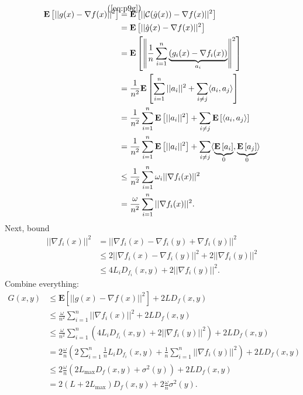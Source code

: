 \documentclass[12pt]{article}
\newcommand{\defeq}[2]{\stackrel{\mathclap{\normalfont\mbox{#1}}}{#2}}
\begin{document}
\begin{equation*}
    \begin{split}
        \mathbf{E}\left[ ||g(x) - \nabla f(x)||^2 \right] &\defeq{(\ref{eq:p9g})}{=} \mathbf{E}\left[ ||\mathcal{C}(\hat{g}(x)) - \nabla f(x)||^2 \right] \\
                &= \mathbf{E}\left[ ||\hat{g}(x) - \nabla f(x)||^2 \right] \\
                &= \mathbf{E}\left[ \left\| \frac{1}{n} \sum_{i=1}^n \underbrace{(g_i(x) - \nabla f_i(x))}_{a_i}\right\|^2\right] \\
                &= \frac{1}{n^2} \mathbf{E}\left[\sum_{i=1}^n ||a_i||^2 + \sum_{i\neq j}\langle a_i, a_j \rangle \right] \\
                &= \frac{1}{n^2} \sum_{i=1}^n \mathbf{E}\left[||a_i||^2\right] + \sum_{i\neq j} \mathbf{E}\left[\langle a_i, a_j \rangle \right] \\
                &= \frac{1}{n^2} \sum_{i=1}^n \mathbf{E}\left[||a_i||^2\right] + \sum_{i\neq j} \langle \underbrace{\mathbf{E}\left[a_i\right]}_{0}, \underbrace{\mathbf{E}\left[a_j\right]}_{0} \rangle \\
                &\leq \frac{1}{n^2} \sum_{i=1}^n \omega_i || \nabla f_i (x)||^2 \\
                &= \frac{\omega}{n^2} \sum_{i=1}^n || \nabla f_i (x)||^2.
    \end{split}
\end{equation*}
Next, bound
\begin{equation*}
    \begin{split}
        || \nabla f_i(x)||^2 &= || \nabla f_i(x) - \nabla f_i(y) + \nabla f_i(y)||^2 \\
                            &\leq 2|| \nabla f_i(x) - \nabla f_i(y)||^2 + 2 || \nabla f_i(y)||^2 \\
                            &\leq 4L_iD_{f_i}(x,y) + 2 ||\nabla f_i(y)||^2.
    \end{split}
\end{equation*}
Combine everything:
\begin{equation}
    \begin{split}
        G(x, y) &\leq \mathbf{E}\left[ ||g(x) - \nabla f(x)||^2 \right] + 2LD_f(x,y) \\
                &\leq \frac{\omega}{n^2} \sum_{i=1}^n || \nabla f_i (x)||^2 + 2LD_f(x,y) \\
                &\leq \frac{\omega}{n^2} \sum_{i=1}^n \left( 4L_iD_{f_i}(x,y) + 2 ||\nabla f_i(y)||^2 \right) + 2LD_f(x,y) \\
                &= 2 \frac{\omega}{n} \left(2 \sum_{i=1}^n \frac{1}{n} L_iD_{f_i}(x,y) + \frac{1}{n} \sum_{i=1}^n ||\nabla f_i(y)||^2 \right)+ 2LD_f(x,y) \\
                &\leq  2 \frac{\omega}{n}\left({2}L_{\text{max}}D_f(x,y) + \sigma^2(y) \right)+ 2LD_f(x,y) \\
                &= 2(L + 2L_{\text{max}})D_f(x,y) + 2 \frac{\omega}{n} \sigma^2(y).
    \end{split}
    \label{eq:gxy_deltanotzero}
\end{equation}
\end{document}
